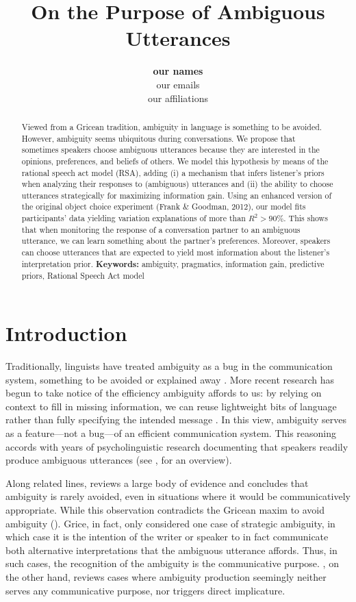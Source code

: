 \documentclass[10pt,a4paper]{article}
\title{On the Purpose of Ambiguous Utterances}
\author{\large \textbf{our names}\\
our emails\\
our affiliations}
\begin{document}
\maketitle

\begin{abstract}
Viewed from a Gricean tradition, ambiguity in language is something to be avoided. 
However, ambiguity seems ubiquitous during conversations. 
We propose that sometimes speakers choose ambiguous utterances because they are interested in the opinions, preferences, and beliefs of others. 
We model this hypothesis by means of the rational speech act model (RSA), adding (i) a mechanism that infers listener’s priors when analyzing their responses to (ambiguous) utterances and (ii) the ability to choose utterances strategically for maximizing information gain.
Using an enhanced version of the original object choice experiment (Frank \& Goodman, 2012), our model fits participants’ data yielding variation explanations of more than $R^2>90\%$.
This shows that when monitoring the response of a conversation partner to an ambiguous utterance, we can learn something about the partner's preferences.
Moreover, speakers can choose utterances that are expected to yield most information about the listener's interpretation prior.
\textbf{Keywords:} 
ambiguity, pragmatics, information gain, predictive priors, Rational Speech Act model
\end{abstract}





\section{Introduction}
Traditionally, linguists have treated ambiguity as a bug in the communication system, something to be avoided or explained away \cite{grice1975,chomsky2002minimalism}.
More recent research has begun to take notice of the efficiency ambiguity affords to us: by relying on context to fill in missing information, we can reuse lightweight bits of language rather than fully specifying the intended message \cite{levinson2000,piantadosietal2012,wasow2015}. 
In this view, ambiguity serves as a feature---not a bug---of an efficient communication system.
This reasoning accords with years of psycholinguistic research documenting that speakers readily produce ambiguous utterances (see , for an overview). 


Along related lines,  reviews a large body of evidence and concludes that ambiguity is rarely avoided, even in situations where it would be communicatively appropriate.
While this observation contradicts the Gricean maxim to avoid ambiguity ().
Grice, in fact, only considered one case of strategic ambiguity, in which case it is the intention of the writer or speaker to in fact communicate both alternative interpretations that the ambiguous utterance affords. 
Thus, in such cases, the recognition of the ambiguity is the communicative purpose. \citeauthor{wasow2015}, on the other hand, reviews cases where ambiguity production seemingly neither serves any communicative purpose, nor triggers direct implicature. 
\end{document}
